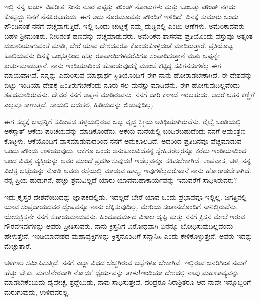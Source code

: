 ಇಲ್ಲಿ ನನ್ನ ಖರ್ಚು ವಿಪರೀತ. ನೀನು ನೂರ ಎಪ್ಪತ್ತು ಪೌಂಡ್ ನೋಟುಗಳು ಮತ್ತು ಒಂಬತ್ತು ಪೌಂಡ್ ನಗದು ಕೊಟ್ಟಿದ್ದು ನಿನಗೆ ನೆನಪಿರಬಹುದು. ಈಗ ಅದು ನೂರಮೂವತ್ತು ಪೌಂಡಿಗೆ ಇಳಿದಿದೆ. ದಿನಕ್ಕೆ ಸುಮಾರು ಒಂದು ಪೌಂಡಿನಂತೆ ನನಗೆ ವೆಚ್ಚವಾಗುತ್ತಿದೆ. ಇಲ್ಲಿ ಒಂದು ಚುಟ್ಟಕ್ಕೆ ನಮ್ಮ ದುಡ್ಡಿನಲ್ಲಿ ಎಂಟು ಆಣೆಗಳು. ಅಮೆರಿಕಾದವರು ಬಹಳ ಶ‍್ರೀಮಂತರು. ನೀರಿನಂತೆ ಹಣವನ್ನು ವೆಚ್ಚಮಾಡುವರು. ಅಮೆರಿಕದ ಶಾಸನವು ಪ್ರತಿಯೊಂದು ವಸ್ತುವೂ ಅತ್ಯಂತ ದುಬಾರಿಯಾಗುವಂತೆ ಮಾಡಿ, ಬೇರೆ ಯಾವ ದೇಶದವರೂ ಕೊಂಡುಕೊಳ್ಳದಂತೆ ಮಾಡಿರುತ್ತಾರೆ. ಪ್ರತಿಯೊಬ್ಬ ಕೂಲಿಯವನು ದಿನಕ್ಕೆ ಒಂಭತ್ತರಿಂದ ಹತ್ತು ರೂಪಾಯಿಗಳವರೆವಿಗೂ ಸಂಪಾದಿಸುತ್ತಾನೆ ಮತ್ತು ಅಷ್ಟನ್ನೇ ಖರ್ಚುಮಾಡುತ್ತಾನೆ. ನಾನು ಇಂಡಿಯಾದಿಂದ ಹೊರಡುವುದಕ್ಕೆ ಮುಂಚೆ ಕಟ್ಟಿದ್ದ ಸವಿಗನಸುಗಳೆಲ್ಲ ಈಗ ಮಾಯವಾಗಿವೆ. ನನ್ನನ್ನು ಎದುರಿಸುವ ಯಾಥಾರ್ಥ ಸ್ಥಿತಿಯೊಂದಿಗೆ ಈಗ ನಾನು ಹೋರಾಡಬೇಕಾಗಿದೆ. ಈ ದೇಶವನ್ನು ಬಿಟ್ಟು ಇಂಡಿಯಾ ದೇಶಕ್ಕೆ ಹಿಂತಿರುಗಬೇಕೆಂದು ನೂರು ಸಲ ಮನಸ್ಸು ಮಾಡಿದೆನು. ಈಗ ಹೋಗುವುದಿಲ್ಲವೆಂದು ಶಪಥಮಾಡಿರುವೆನು. ದೇವರೆ ನನಗೆ ಅಪ್ಪಣೆ ಮಾಡಿರುವನು. ನನಗೆ ದಾರಿ ಕಾಣದೆ ಇರಬಹುದು. ಆದರೆ ಆತನ ಕಣ್ಣಿಗೆ ಎಲ್ಲವೂ ಕಾಣುತ್ತದೆ. ಸಾಯಲಿ ಬದುಕಲಿ, ಹಿಡಿದುದನ್ನು ಬಿಡುವುದಿಲ್ಲ.

ಈಗ ಸದ್ಯಕ್ಕೆ ಬಾಸ್ಟನ್ನಿಗೆ ಸಮೀಪದ ಹಳ್ಳಿಯಲ್ಲಿರುವ ಒಬ್ಬ ವೃದ್ಧ ಸ್ತ್ರೀಯ ಅತಿಥಿಯಾಗಿರುವೆನು. ರೈಲ್ವೆ ಬಂಡಿಯಲ್ಲಿ ಅಕಸ್ಮಾತ್ ಆಕೆಯ ಪರಿಚಯವನ್ನು ಮಾಡಿಕೊಂಡೆನು. ಆಕೆಯ ಮನೆಯಲ್ಲಿ ಬಂದಿರಬಹುದೆಂದು ನನಗೆ ಆಮಂತ್ರಣ ಕೊಟ್ಟಳು. ಆಕೆಯೊಂದಿಗೆ ವಾಸಮಾಡುವುದರಿಂದ ನನಗೆ ಅನುಕೂಲವಿದೆ. ಅದರಿಂದ ಪ್ರತಿದಿನವೂ ವೆಚ್ಚಮಾಡುವ ಒಂದು ಪೌಂಡು ಉಳಿಯುವುದು. ಆಕೆಗೂ ಒಂದು ಅನುಕೂಲವಿದೆ\enginline{-}ತನ್ನ ಸ್ನೇಹಿತರೆಲ್ಲರನ್ನೂ ಕರೆದು ಇಂಡಿಯಾದಿಂದ ಬಂದ ವಿಚಿತ್ರ ವ್ಯಕ್ತಿಯನ್ನು ಅವರ ಮುಂದೆ ಪ್ರದರ್ಶಿಸುವುದು! ಇದೆಲ್ಲವನ್ನೂ ಸಹಿಸಬೇಕಾಗಿದೆ. ಉಪವಾಸ, ಚಳಿ, ನನ್ನ ವಿಚಿತ್ರ ಬಟ್ಟೆಯನ್ನು ನೋಡಿ ಅವರು ರಸ್ತೆಯಲ್ಲಿ ಮಾಡುವ ಹಾಸ್ಯ, ಇವುಗಳೆಲ್ಲದರೊಡನೆ ನಾನು ಹೋರಾಡಬೇಕಾಗಿದೆ. ನನ್ನ ಪ್ರಿಯ ಹುಡುಗನೆ, ಹೆಚ್ಚು ಶ್ರಮವಿಲ್ಲದೆ ಯಾರು ಯಾವಮಹಾಕಾರ್ಯವನ್ನು ಇದುವರೆಗೆ ಸಾಧಿಸಿರುವರು?

ಇದು ಕ್ರೈಸ್ತರ ದೇಶವೆಂಬುದನ್ನು ಜ್ಞಾಪಕದಲ್ಲಿಡು. ಇದಲ್ಲದೆ ಬೇರೆ ಯಾವ ಒಂದು ಪ್ರಭಾವವೂ ಇಲ್ಲಿಲ್ಲ. ಜಗತ್ತಿನಲ್ಲಿ ಯಾವ ಸಂಪ್ರದಾಯದವರ ದ್ವೇಷವನ್ನೂ ನಾನು ಲೆಕ್ಕಿಸುವುದಿಲ್ಲ. ಮೇರಿಯ ಸಂತಾನದೊಂದಿಗೆ ನಾನಿಲ್ಲಿರುವೆನು. ಯೇಸುಕ್ರಿಸ್ತನೇ ನನಗೆ ಸಹಾಯಮಾಡುವನು. ಹಿಂದೂಧರ್ಮದ ವಿಶಾಲ ದೃಷ್ಟಿ ಮತ್ತು ನನಗೆ ಕ್ರಿಸ್ತನ ಮೇಲೆ ಇರುವ ಗೌರವ\enginline{-}ಇವುಗಳನ್ನು ಅವರು ಪ್ರೀತಿಸುವರು. ನಾನು ಕ್ರಿಸ್ತನಿಗೆ ವಿರೋಧವಾಗಿ ಏನನ್ನೂ ಬೋಧಿಸುವುದಿಲ್ಲವೆಂದು ಹೇಳುತ್ತೇನೆ. ಇಂಡಿಯಾದೇಶದ ಮಹಾವ್ಯಕ್ತಿಗಳನ್ನು ಕ್ರಿಸ್ತನೊಂದಿಗೆ ಸನ್ಮಾನಿಸಿ ಎಂದು ಕೇಳಿಕೊಳ್ಳುತ್ತೇನೆ. ಅವರು ಇದನ್ನು ಮೆಚ್ಚುತ್ತಾರೆ.

ಚಳಿಗಾಲ ಸಮೀಪಿಸುತ್ತಿದೆ. ನನಗೆ ಎಲ್ಲಾ ವಿಧದ ಬೆಚ್ಚಗಿರುವ ಬಟ್ಟೆಗಳೂ ಬೇಕಾಗಿವೆ. ಇಲ್ಲಿರುವ ಜನರಿಗಿಂತ ನಮಗೆ ಹೆಚ್ಚು ಬೇಕು. ಮಗು!ನೇರವಾಗಿ ನೋಡು! ಧೈರ್ಯವನ್ನು ತಾಳು!ಇಂಡಿಯಾ ದೇಶದಲ್ಲಿ ನಾವು ಮಹಾಕಾವ್ಯವನ್ನು ಮಾಡಬೇಕೆಂಬುದು ದೈವೇಚ್ಛೆ, ಶ್ರದ್ದೆಯಿಡು, ನಾವು ಸಾಧಿಸುತ್ತೇವೆ. ದರಿದ್ರರೂ ನಿರಾಶ್ರಿತರೂ ಆದ ನಾವೇ ಇನ್ನೊಬ್ಬರಿಗೆ ಮರುಗುವುದು, ಉಳಿದವರಲ್ಲ.


